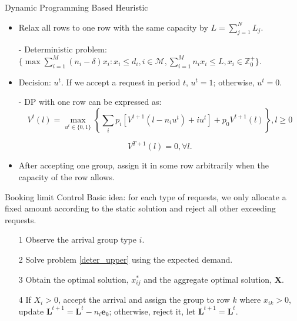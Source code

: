       \begin{frame}{Dynamic Programming Based Heuristic}
        \begin{itemize}
        \item Relax all rows to one row with the same capacity by $L = \sum_{j=1}^{N} L_j$.
        \item[-] Deterministic problem: $\{\max \sum_{i=1}^{M} (n_i- \delta) x_{i}: x_{i} \leq d_{i}, i \in \mathcal{M}, \sum_{i=1}^{M} n_{i} x_{i} \leq L, x_{i} \in \mathbb{Z}^{+}_{0}\}$.
        \item Decision: $u^{t}$. If we accept a request in period $t$, $u^t = 1$; otherwise, $u^t =0$.  
        \item[-] DP with one row can be expressed as:
        $$V^{t}(l) =  \max_{u^{t} \in \{0,1\}} \left\{ \sum_{i} p_i [V^{t+1}(l-n_i u^{t})+ i u^{t}] + p_0 V^{t+1}(l)\right\}, l \geq 0 $$

        $$V^{T+1}(l) =0, \forall l.$$
        \item After accepting one group, assign it in some row arbitrarily when the capacity of the row allows.
        \end{itemize}
      \end{frame}
      
      \begin{frame}{Booking limit Control}
        Basic idea: for each type of requests, we only allocate a fixed amount according to the static solution and reject all other exceeding requests.
        \begin{itemize}
          \item[1] Observe the arrival group type $i$.
          \item[2] Solve problem \eqref{deter_upper} using the expected demand.
          \item[3] Obtain the optimal solution, $x_{ij}^{*}$ and the aggregate optimal solution, $\mathbf{X}$.
          \item[4] If $X_{i} > 0$, accept the arrival and assign the group to row $k$ where $x_{ik} > 0$, update $\mathbf{L}^{t+1} = \mathbf{L}^{t} - n_i \mathbf{e}_{k}$; otherwise, reject it, let $\mathbf{L}^{t+1} = \mathbf{L}^{t}$.
        \end{itemize}
                 
      \end{frame}